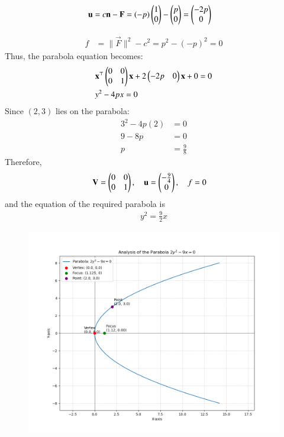 \documentclass[article]{IEEEtran}
\begin{document}
\begin{align}
	\mathbf{u} &= c\mathbf{n} - \mathbf{F} 
	= (-p)\begin{pmatrix}1 \\ 0\end{pmatrix} - \begin{pmatrix}p \\ 0\end{pmatrix} 
	= \begin{pmatrix}-2p \\ 0\end{pmatrix}
\end{align}

\begin{align}
	f &= \|\vec{F}\|^2 - c^2 = p^2 - (-p)^2 = 0
\end{align}
Thus, the parabola equation becomes:
\begin{align}
	&\mathbf{x}^\top \begin{pmatrix}0 & 0 \\ 0 & 1\end{pmatrix}\mathbf{x} 
	+ 2\begin{pmatrix}-2p & 0\end{pmatrix}\mathbf{x} + 0 = 0\\
	&y^2 - 4px = 0
\end{align}
Since $(2,3)$ lies on the parabola:
\begin{align}
	3^2 - 4p(2) &= 0 \\
	9 - 8p &= 0 \\
	p &= \frac{9}{8}
\end{align}
Therefore,
\begin{align}
	\mathbf{V} &= \begin{pmatrix}0 & 0 \\ 0 & 1\end{pmatrix}, \quad
	\mathbf{u} = \begin{pmatrix}-\tfrac{9}{4} \\ 0\end{pmatrix}, \quad
	f = 0
\end{align}
and the equation of the required parabola is
\begin{align}
	y^2 = \frac{9}{2}x
\end{align}
\begin{figure}[H]
	\centering
	\includegraphics[width=1.\linewidth]{figs/parabola}

\end{figure}

	
\end{document}
